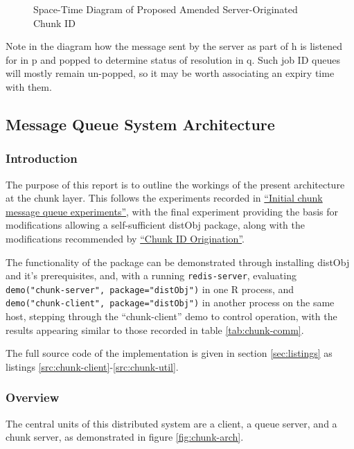 \begin{figure}
	\centering
	
	\caption{\label{fig:masi} Space-Time Diagram of Proposed Amended Server-Originated Chunk ID}
\end{figure}

Note in the diagram how the message sent by the server as part of
\textcolor{dark2-1}{h} is listened for in \textcolor{dark2-6}{p} and popped to
determine status of resolution in \textcolor{dark2-6}{q}.
Such job ID queues will mostly remain un-popped, so it may be worth associating
an expiry time with them.

\subsection{Message Queue System Architecture}

\subsubsection{Introduction}

The purpose of this report is to outline the workings of the present
architecture at the chunk layer.
This follows the experiments recorded in
\href{init-chunk-msg-q-exp.pdf}{``Initial chunk message queue experiments''},
with the final experiment providing the basis for modifications allowing a
self-sufficient distObj package, along with the modifications recommended by
\href{chunk-id-orig.pdf}{``Chunk ID Origination''}.

The functionality of the package can be demonstrated through installing distObj
and it's prerequisites, and, with a running \texttt{redis-server}, evaluating
\texttt{demo("chunk-server", package="distObj")} in one R
process, and \texttt{demo("chunk-client", package="distObj")} in
another process on the same host, stepping through the ``chunk-client'' demo to
control operation, with the results appearing similar to those recorded in
table \cref{tab:chunk-comm}.

The full source code of the implementation is given in section
\cref{sec:listings} as listings \cref{src:chunk-client}-\cref{src:chunk-util}.

\subsubsection{Overview}

The central units of this distributed system are a client, a queue server, and
a chunk server, as demonstrated in figure \cref{fig:chunk-arch}.

